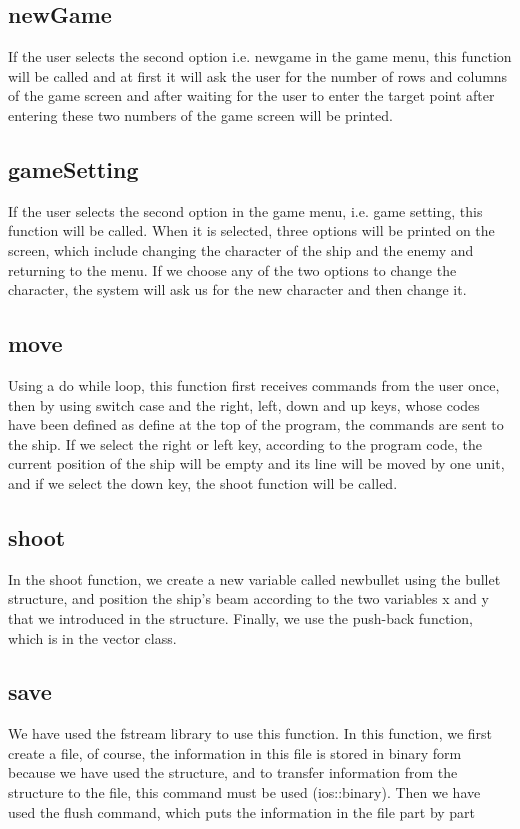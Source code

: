 \documentclass[12pt,a4paper]{article}
\begin{document}
	\subsection{newGame}
	If the user selects the second option i.e. newgame in the game menu, 
	this function will be called and at first it will ask the user for the number of rows and columns of the game screen and after waiting for the user to enter the target point after entering these two numbers of the game screen will be printed.
	\subsection{gameSetting}
	If the user selects the second option in the game menu, i.e. game setting, this function will be called. When it is selected, 
	three options will be printed on the screen, which include changing the character of the ship and the enemy and returning to the menu. If we choose any of the two options to change the character, 
	the system will ask us for the new character and then change it.
	\subsection{move}
	Using a do while loop, this function first receives commands from the user once, then by using switch case and the right, left, down and up keys,
	whose codes have been defined as define at the top of the program, the commands are sent to the ship. If we select the right or left key,
	according to the program code, the current position of the ship will be empty and its line will be moved by one unit, and if we select the down key,
	the shoot function will be called.
	\subsection{shoot}
	In the shoot function, we create a new variable called newbullet using the bullet structure, 
	and position the ship's beam according to the two variables x and y that we introduced in the structure.
	 Finally, we use the push-back function, which is in the vector class.
	\subsection{save}
	We have used the fstream library to use this function.
    In this function, we first create a file, of course, the information in this file is stored in binary form because we have used the structure, and to transfer information from the structure to the file, this command must be used (ios::binary).
    Then we have used the flush command, which puts the information in the file part by part
\end{document}
